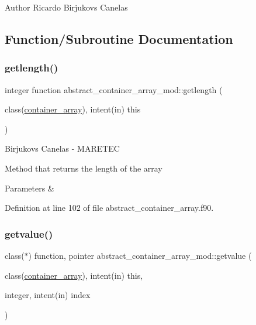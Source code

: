 \begin{DoxyAuthor}{Author}
Ricardo Birjukovs Canelas 
\end{DoxyAuthor}


\subsection{Function/\+Subroutine Documentation}
\mbox{\label{namespaceabstract__container__array__mod_a22d71ca3f03bf0bb5d3737338e5e349a}} 
\subsubsection{\texorpdfstring{getlength()}{getlength()}}
{\footnotesize\ttfamily integer function abstract\+\_\+container\+\_\+array\+\_\+mod\+::getlength (\begin{DoxyParamCaption}\item[{class(\hyperlink{structabstract__container__array__mod_1_1container__array}{container\+\_\+array}), intent(in)}]{this }\end{DoxyParamCaption})\hspace{0.3cm}{\ttfamily [private]}}



Birjukovs Canelas -\/ M\+A\+R\+E\+T\+EC 

Method that returns the length of the array 
\begin{DoxyParams}{Parameters}
{\em } & \\
\hline
\end{DoxyParams}


Definition at line 102 of file abstract\+\_\+container\+\_\+array.\+f90.

\mbox{\label{namespaceabstract__container__array__mod_a2b3e0aec504d76c73bf7f18158924af4}} 
\subsubsection{\texorpdfstring{getvalue()}{getvalue()}}
{\footnotesize\ttfamily class($\ast$) function, pointer abstract\+\_\+container\+\_\+array\+\_\+mod\+::getvalue (\begin{DoxyParamCaption}\item[{class(\hyperlink{structabstract__container__array__mod_1_1container__array}{container\+\_\+array}), intent(in)}]{this,  }\item[{integer, intent(in)}]{index }\end{DoxyParamCaption})\hspace{0.3cm}{\ttfamily [private]}}



